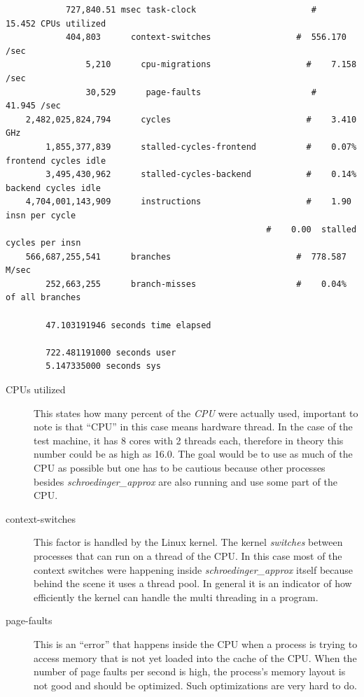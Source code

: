 \documentclass[11pt,DIV=10,final]{scrreprt} %
\begin{document}
\begin{minipage}{\textwidth}
    \begin{lstlisting}
            727,840.51 msec task-clock                       #   15.452 CPUs utilized
            404,803      context-switches                 #  556.170 /sec
                5,210      cpu-migrations                   #    7.158 /sec
                30,529      page-faults                      #   41.945 /sec
    2,482,025,824,794      cycles                           #    3.410 GHz
        1,855,377,839      stalled-cycles-frontend          #    0.07% frontend cycles idle
        3,495,430,962      stalled-cycles-backend           #    0.14% backend cycles idle
    4,704,001,143,909      instructions                     #    1.90  insn per cycle
                                                    #    0.00  stalled cycles per insn
    566,687,255,541      branches                         #  778.587 M/sec
        252,663,255      branch-misses                    #    0.04% of all branches

        47.103191946 seconds time elapsed

        722.481191000 seconds user
        5.147335000 seconds sys
    \end{lstlisting}
    \begin{description}
      \item[CPUs utilized] This states how many percent of the \emph{CPU} were actually used, important to note is that ``CPU'' in this case means hardware thread. In the case of the test machine, it
            has 8 cores with 2 threads each, therefore in theory this number could be as high as 16.0. The goal would be to use as much of the CPU as possible but one has to be cautious because other
            processes besides \emph{schroedinger\_approx} are also running and use some part of the CPU.

      \item[context-switches] This factor is handled by the Linux kernel. The kernel \emph{switches} between processes that can run on a thread of the CPU. In this case most of the context switches were
            happening inside \emph{schroedinger\_approx} itself because behind the scene it uses a thread pool. In general it is an indicator of how efficiently the kernel can handle the multi threading in
            a program.
      \item[page-faults] This is an ``error'' that happens inside the CPU when a process is trying to access memory that is not yet loaded into the cache of the CPU. When the number of page faults per
            second is high, the process's memory layout is not good and should be optimized. Such optimizations are very hard to do.


\end{description}
\end{minipage}
\end{document}
